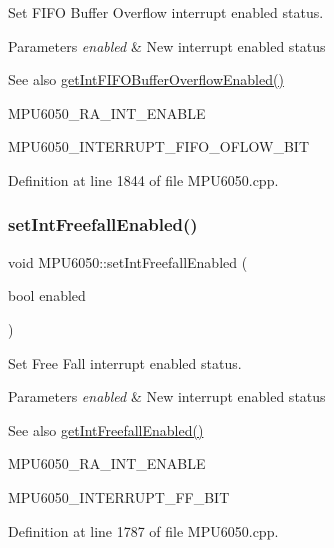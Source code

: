 Set F\+I\+FO Buffer Overflow interrupt enabled status. 


\begin{DoxyParams}{Parameters}
{\em enabled} & New interrupt enabled status \\
\hline
\end{DoxyParams}
\begin{DoxySeeAlso}{See also}
\mbox{\hyperlink{classMPU6050_a55f99c88cc84901f245924ed5e3fe47e}{get\+Int\+F\+I\+F\+O\+Buffer\+Overflow\+Enabled()}} 

M\+P\+U6050\+\_\+\+R\+A\+\_\+\+I\+N\+T\+\_\+\+E\+N\+A\+B\+LE 

M\+P\+U6050\+\_\+\+I\+N\+T\+E\+R\+R\+U\+P\+T\+\_\+\+F\+I\+F\+O\+\_\+\+O\+F\+L\+O\+W\+\_\+\+B\+IT 
\end{DoxySeeAlso}


Definition at line 1844 of file M\+P\+U6050.\+cpp.

\mbox{\label{classMPU6050_a01a24a05f06463d5277e1670d6260e03}} 
\subsubsection{\texorpdfstring{setIntFreefallEnabled()}{setIntFreefallEnabled()}}
{\footnotesize\ttfamily void M\+P\+U6050\+::set\+Int\+Freefall\+Enabled (\begin{DoxyParamCaption}\item[{bool}]{enabled }\end{DoxyParamCaption})}



Set Free Fall interrupt enabled status. 


\begin{DoxyParams}{Parameters}
{\em enabled} & New interrupt enabled status \\
\hline
\end{DoxyParams}
\begin{DoxySeeAlso}{See also}
\mbox{\hyperlink{classMPU6050_a500bb2df2e46eaecd3fb2ba7304a5ed3}{get\+Int\+Freefall\+Enabled()}} 

M\+P\+U6050\+\_\+\+R\+A\+\_\+\+I\+N\+T\+\_\+\+E\+N\+A\+B\+LE 

M\+P\+U6050\+\_\+\+I\+N\+T\+E\+R\+R\+U\+P\+T\+\_\+\+F\+F\+\_\+\+B\+IT 
\end{DoxySeeAlso}


Definition at line 1787 of file M\+P\+U6050.\+cpp.

